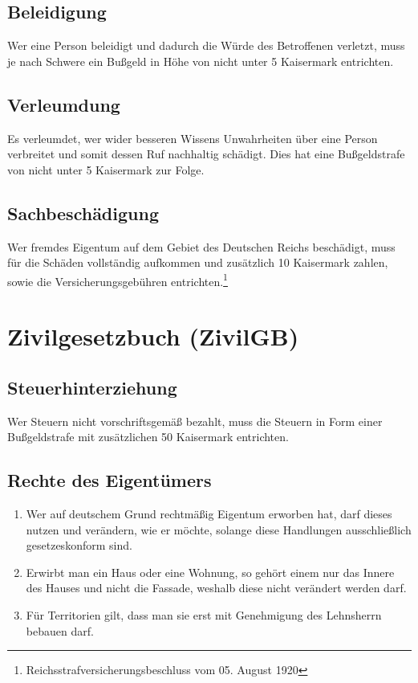 \documentclass{article}
\begin{document}
\subsection{Beleidigung}
Wer eine Person beleidigt und dadurch die Würde des Betroffenen verletzt, muss je nach Schwere ein Bußgeld in Höhe von nicht unter 5 Kaisermark entrichten.

\subsection{Verleumdung}
Es verleumdet, wer wider besseren Wissens Unwahrheiten über eine Person verbreitet und somit dessen Ruf nachhaltig schädigt. Dies hat eine Bußgeldstrafe von nicht unter 5 Kaisermark zur Folge.

\subsection{Sachbeschädigung}
Wer fremdes Eigentum auf dem Gebiet des Deutschen Reichs beschädigt, muss für die Schäden vollständig aufkommen und zusätzlich 10 Kaisermark zahlen, sowie die Versicherungsgebühren entrichten.\footnote{Reichsstrafversicherungsbeschluss vom 05. August 1920}

\newpage
\section{Zivilgesetzbuch (ZivilGB)}
\localtableofcontents

\subsection{Steuerhinterziehung}\label{hinterz}
Wer Steuern nicht vorschriftsgemäß bezahlt, muss die Steuern in Form einer Bußgeldstrafe mit zusätzlichen 50 Kaisermark entrichten.

\subsection{Rechte des Eigentümers}
\begin{enumerate}[(1)]
    \item Wer auf deutschem Grund rechtmäßig Eigentum erworben hat, darf dieses nutzen und verändern, wie er möchte, solange diese Handlungen ausschließlich gesetzeskonform sind.
    \item Erwirbt man ein Haus oder eine Wohnung, so gehört einem nur das Innere des Hauses und nicht die Fassade, weshalb diese nicht verändert werden darf.
    \item Für Territorien gilt, dass man sie erst mit Genehmigung des Lehnsherrn bebauen darf.
\end{enumerate}
\end{document}
